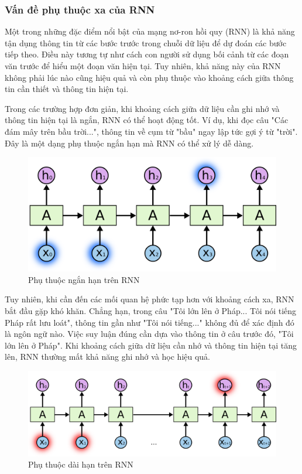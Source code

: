 \subsubsection{Vấn đề phụ thuộc xa của RNN}

\indent Một trong những đặc điểm nổi bật của mạng nơ-ron hồi quy (RNN) là khả năng tận dụng thông tin từ các bước trước trong chuỗi dữ liệu để dự đoán các bước tiếp theo. Điều này tương tự như cách con người sử dụng bối cảnh từ các đoạn văn trước để hiểu một đoạn văn hiện tại. Tuy nhiên, khả năng này của RNN không phải lúc nào cũng hiệu quả và còn phụ thuộc vào khoảng cách giữa thông tin cần thiết và thông tin hiện tại.

\indent Trong các trường hợp đơn giản, khi khoảng cách giữa dữ liệu cần ghi nhớ và thông tin hiện tại là ngắn, RNN có thể hoạt động tốt. Ví dụ, khi đọc câu "Các đám mây trên bầu trời...", thông tin về cụm từ "bầu" ngay lập tức gợi ý từ "trời". Đây là một dạng phụ thuộc ngắn hạn mà RNN có thể xử lý dễ dàng.
\begin{figure}[H]
    \centering
    \includegraphics[width=\textwidth,height=\textheight,keepaspectratio]{Images/Theoretical basis/RNN-shorttermdepdencies.png}
    \caption{Phụ thuộc ngắn hạn trên RNN}
    \label{fig:enter-label}
\end{figure}
\indent Tuy nhiên, khi cần đến các mối quan hệ phức tạp hơn với khoảng cách xa, RNN bắt đầu gặp khó khăn. Chẳng hạn, trong câu "Tôi lớn lên ở Pháp... Tôi nói tiếng Pháp rất lưu loát", thông tin gần như "Tôi nói tiếng..." không đủ để xác định đó là ngôn ngữ nào. Việc suy luận đúng cần dựa vào thông tin ở câu trước đó, "Tôi lớn lên ở Pháp". Khi khoảng cách giữa dữ liệu cần nhớ và thông tin hiện tại tăng lên, RNN thường mất khả năng ghi nhớ và học hiệu quả.
\begin{figure}[H]
    \centering
    \includegraphics[width=\textwidth,height=\textheight,keepaspectratio]{Images/Theoretical basis/RNN-longtermdependencies.png}
    \caption{Phụ thuộc dài hạn trên RNN}
    \label{fig:enter-label}
\end{figure}
